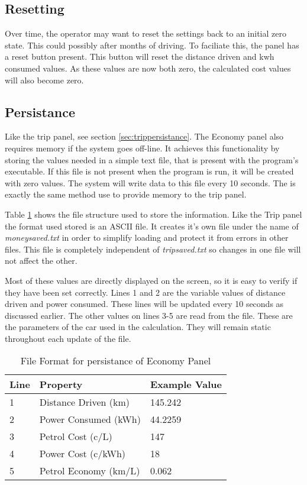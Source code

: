 \subsection{Resetting}

Over time, the operator may want to reset the settings back to an initial zero state. This could possibly after months of driving. To faciliate this, the panel has a reset button present. This button will reset the distance driven and kwh consumed values. As these values are now both zero, the calculated cost values will also become zero.

\subsection{Persistance}

Like the trip panel, see section \ref{sec:trippersistance}. The Economy panel also requires memory if the system goes off-line.  It achieves this functionality by storing the values needed in a simple text file, that is present with the program's executable. If this file is not present when the program is run, it will be created with zero values. The system will write data to this file every 10 seconds. The is exactly the same method use to provide memory to the trip panel.

Table \ref{tab:economyformat} shows the file structure used to store the information. Like the Trip panel the format used  stored is an ASCII file.  It creates it's own file under the name of \emph{moneysaved.txt} in order to simplify loading and protect it from errors in other files. This file is completely independent of \emph{tripsaved.txt} so changes in one file will not affect the other.

Most of these values are directly displayed on the screen, so it is easy to verify if they have been set correctly. Lines 1 and 2 are the variable values of distance driven and power consumed. These lines will be updated every 10 seconds as discussed earlier. The other values on lines 3-5 are read from the file. These are the parameters of the car used in the calculation. They will remain static throughout each update of the file.

\begin{table}
\begin{center}
    \begin{tabular}{|l|l|l|}
        \hline
        Line & Property              & Example Value \\ \hline
        1    & Distance Driven (km)  & 145.242       \\ 
        2    & Power Consumed (kWh)  & 44.2259       \\ 
        3    & Petrol Cost (c/L)     & 147           \\ 
        4    & Power Cost (c/kWh)    & 18            \\ 
        5    & Petrol Economy (km/L) & 0.062         \\
        \hline
    \end{tabular}
	\caption{File Format for persistance of Economy Panel}
	\label{tab:economyformat}
\end{center}
\end{table}




